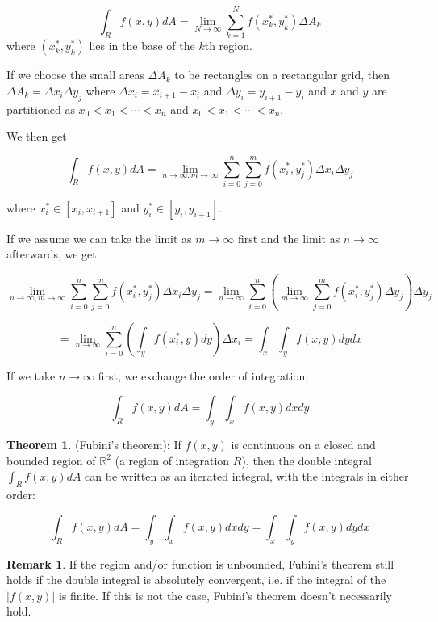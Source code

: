\documentclass[12pt,a4paper]{article}
\theoremstyle{definition}
\newtheorem{theorem}[definition]{Theorem}
\newtheorem*{remark}{Remark}
\begin{document}
\[\int_R f(x, y) dA = \lim_{N \rightarrow \infty} \sum_{k = 1}^N f(x_k^*, y_k^*) \Delta A_k\] where $(x_k^*, y_k^*)$ lies in the base of the $k$th region.

If we choose the small areas $\Delta A_k$ to be rectangles on a rectangular grid, then $\Delta A_k = \Delta x_i \Delta y_j$ where $\Delta x_i = x_{i + 1} - x_i$ and $\Delta y_i = y_{i + 1} - y_i$ and $x$ and $y$ are partitioned as $x_0 < x_1 < \cdots < x_n$ and $x_0 < x_1 < \cdots < x_n$.

We then get

\[\int_R f(x, y) dA = \lim_{n \rightarrow \infty, m \rightarrow \infty} \sum_{i = 0}^n \sum_{j = 0}^m f(x_i^*, y_j^*) \Delta x_i \Delta y_j\]

where $x_i^* \in [x_i, x_{i + 1}]$ and $y_i^* \in [y_i, y_{i + 1}]$.

If we assume we can take the limit as $m \rightarrow \infty$ first and the limit as $n \rightarrow \infty$ afterwards, we get

\[\lim_{n \rightarrow \infty, m \rightarrow \infty} \sum_{i = 0}^n \sum_{j = 0}^m f(x_i^*, y_j^*) \Delta x_i \Delta y_j = \lim_{n \rightarrow \infty} \sum_{i = 0}^n (\lim_{m \rightarrow \infty} \sum_{j = 0}^m f(x_i^*, y_j^*) \Delta y_j) \Delta y_j\]

\[= \lim_{n \rightarrow \infty} \sum_{i = 0}^n (\int_y f(x_i^*, y) dy) \Delta x_i = \int_x \int_y f(x, y) dy dx\]

If we take $n \rightarrow \infty$ first, we exchange the order of integration:

\[\int_R f(x, y) dA = \int_y \int_x f(x, y) dx dy\]

\begin{theorem}
	(Fubini's theorem): If $f(x, y)$ is continuous on a closed and bounded region of $\mathbb{R}^2$ (a region of integration $R$), then the double integral $\int_R f(x, y) dA$ can be written as an iterated integral, with the integrals in either order:

	\[\int_R f(x, y) dA = \int_y \int_x f(x, y) dx dy = \int_x \int_y f(x, y) dy dx\]
\end{theorem}

\begin{remark}
	If the region and/or function is unbounded, Fubini's theorem still holds if the double integral is absolutely convergent, i.e. if the integral of the $|f(x, y)|$ is finite. If this is not the case, Fubini's theorem doesn't necessarily hold.
\end{remark}
\end{document}
